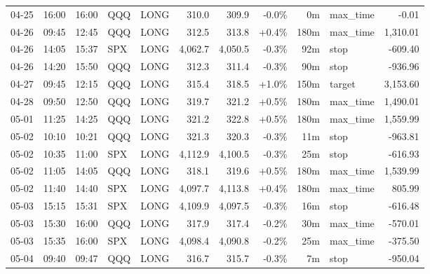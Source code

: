 \documentclass[11pt,a4paper,twoside]{article}
\begin{document}
\begin{center}
\begin{longtable}{>{\color{txtmain}}l l l l l r r r r >{\color{txtmain}}l r}
04-25 & 16:00 & 16:00 & QQQ & LONG & 310.0 & 309.9 & \textcolor{lossred}{-0.0\%} & 0m & max\_time & \textcolor{lossred}{-0.01} \\
04-26 & 09:45 & 12:45 & QQQ & LONG & 312.5 & 313.8 & \textcolor{wingreen}{+0.4\%} & 180m & max\_time & \textcolor{wingreen}{1,310.01} \\
04-26 & 14:05 & 15:37 & SPX & LONG & 4,062.7 & 4,050.5 & \textcolor{lossred}{-0.3\%} & 92m & stop & \textcolor{lossred}{-609.40} \\
04-26 & 14:20 & 15:50 & QQQ & LONG & 312.3 & 311.4 & \textcolor{lossred}{-0.3\%} & 90m & stop & \textcolor{lossred}{-936.96} \\
04-27 & 09:45 & 12:15 & QQQ & LONG & 315.4 & 318.5 & \textcolor{wingreen}{+1.0\%} & 150m & target & \textcolor{wingreen}{3,153.60} \\
04-28 & 09:50 & 12:50 & QQQ & LONG & 319.7 & 321.2 & \textcolor{wingreen}{+0.5\%} & 180m & max\_time & \textcolor{wingreen}{1,490.01} \\
05-01 & 11:25 & 14:25 & QQQ & LONG & 321.2 & 322.8 & \textcolor{wingreen}{+0.5\%} & 180m & max\_time & \textcolor{wingreen}{1,559.99} \\
05-02 & 10:10 & 10:21 & QQQ & LONG & 321.3 & 320.3 & \textcolor{lossred}{-0.3\%} & 11m & stop & \textcolor{lossred}{-963.81} \\
05-02 & 10:35 & 11:00 & SPX & LONG & 4,112.9 & 4,100.5 & \textcolor{lossred}{-0.3\%} & 25m & stop & \textcolor{lossred}{-616.93} \\
05-02 & 11:05 & 14:05 & QQQ & LONG & 318.1 & 319.6 & \textcolor{wingreen}{+0.5\%} & 180m & max\_time & \textcolor{wingreen}{1,539.99} \\
05-02 & 11:40 & 14:40 & SPX & LONG & 4,097.7 & 4,113.8 & \textcolor{wingreen}{+0.4\%} & 180m & max\_time & \textcolor{wingreen}{805.99} \\
05-03 & 15:15 & 15:31 & SPX & LONG & 4,109.9 & 4,097.5 & \textcolor{lossred}{-0.3\%} & 16m & stop & \textcolor{lossred}{-616.48} \\
05-03 & 15:30 & 16:00 & QQQ & LONG & 317.9 & 317.4 & \textcolor{lossred}{-0.2\%} & 30m & max\_time & \textcolor{lossred}{-570.01} \\
05-03 & 15:35 & 16:00 & SPX & LONG & 4,098.4 & 4,090.8 & \textcolor{lossred}{-0.2\%} & 25m & max\_time & \textcolor{lossred}{-375.50} \\
05-04 & 09:40 & 09:47 & QQQ & LONG & 316.7 & 315.7 & \textcolor{lossred}{-0.3\%} & 7m & stop & \textcolor{lossred}{-950.04} \\

\end{longtable}
\end{center}
\end{document}
